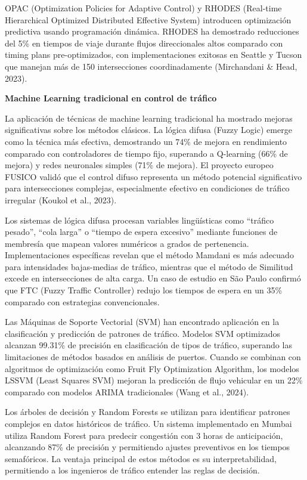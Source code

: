 \documentclass[12pt,a4paper,oneside]{report}
\begin{document}
OPAC (Optimization Policies for Adaptive Control) y RHODES (Real-time Hierarchical Optimized Distributed Effective System) introducen optimización predictiva usando programación dinámica. RHODES ha demostrado reducciones del 5\% en tiempos de viaje durante flujos direccionales altos comparado con timing plans pre-optimizados, con implementaciones exitosas en Seattle y Tucson que manejan más de 150 intersecciones coordinadamente (Mirchandani \& Head, 2023).

\textbf{Machine Learning tradicional en control de tráfico}

La aplicación de técnicas de machine learning tradicional ha mostrado mejoras significativas sobre los métodos clásicos. La lógica difusa (Fuzzy Logic) emerge como la técnica más efectiva, demostrando un 74\% de mejora en rendimiento comparado con controladores de tiempo fijo, superando a Q-learning (66\% de mejora) y redes neuronales simples (71\% de mejora). El proyecto europeo FUSICO validó que el control difuso representa un método potencial significativo para intersecciones complejas, especialmente efectivo en condiciones de tráfico irregular (Koukol et al., 2023).

Los sistemas de lógica difusa procesan variables lingüísticas como ``tráfico pesado'', ``cola larga'' o ``tiempo de espera excesivo'' mediante funciones de membresía que mapean valores numéricos a grados de pertenencia. Implementaciones específicas revelan que el método Mamdani es más adecuado para intensidades bajas-medias de tráfico, mientras que el método de Similitud excede en intersecciones de alta carga. Un caso de estudio en São Paulo confirmó que FTC (Fuzzy Traffic Controller) redujo los tiempos de espera en un 35\% comparado con estrategias convencionales.

Las Máquinas de Soporte Vectorial (SVM) han encontrado aplicación en la clasificación y predicción de patrones de tráfico. Modelos SVM optimizados alcanzan 99.31\% de precisión en clasificación de tipos de tráfico, superando las limitaciones de métodos basados en análisis de puertos. Cuando se combinan con algoritmos de optimización como Fruit Fly Optimization Algorithm, los modelos LSSVM (Least Squares SVM) mejoran la predicción de flujo vehicular en un 22\% comparado con modelos ARIMA tradicionales (Wang et al., 2024).

Los árboles de decisión y Random Forests se utilizan para identificar patrones complejos en datos históricos de tráfico. Un sistema implementado en Mumbai utiliza Random Forest para predecir congestión con 3 horas de anticipación, alcanzando 87\% de precisión y permitiendo ajustes preventivos en los tiempos semafóricos. La ventaja principal de estos métodos es su interpretabilidad, permitiendo a los ingenieros de tráfico entender las reglas de decisión.
\end{document}
